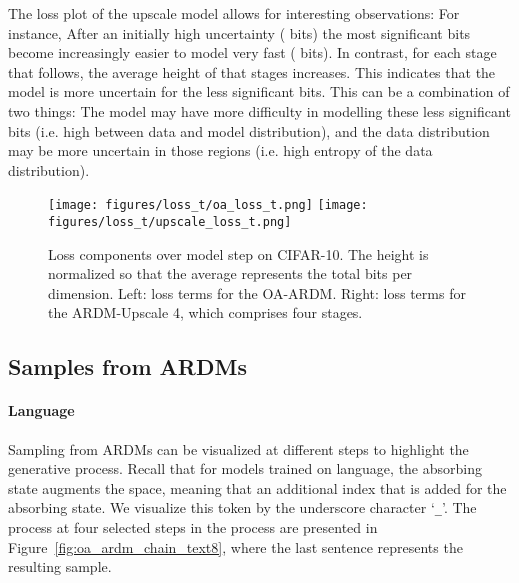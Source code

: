 \documentclass{article} \usepackage{iclr2022_conference,times}
\begin{document}
The loss plot of the upscale model allows for interesting observations: For instance, After an initially high uncertainty ( bits) the most significant bits become increasingly easier to model very fast ( bits). In contrast, for each stage that follows, the average height of that stages increases. This indicates that the model is more uncertain for the less significant bits. This can be a combination of two things: The model may have more difficulty in modelling these less significant bits (i.e. high  between data and model distribution), and the data distribution may be more uncertain in those regions (i.e. high entropy of the data distribution). 
\begin{figure}[H]
    \vspace{-.1cm}
    \centering
    \texttt{[image: figures/loss\_t/oa\_loss\_t.png]} \hfill 
    \texttt{[image: figures/loss\_t/upscale\_loss\_t.png]}
    \vspace{-.3cm}
    \caption{Loss components over model step on CIFAR-10. The height is normalized so that the average represents the total bits per dimension. Left: loss terms for the OA-ARDM. Right: loss terms for the ARDM-Upscale 4, which comprises four stages.}
    \label{fig:loss_t}
    \vspace{-.3cm}
\end{figure}


\subsection{Samples from ARDMs}
\paragraph{Language} Sampling from ARDMs can be visualized at different steps  to highlight the generative process. Recall that for models trained on language, the absorbing state augments the space, meaning that an additional index that is added for the absorbing state. We visualize this token by the underscore character `\texttt{\_}'. The process at four selected steps in the process are presented in Figure~\ref{fig:oa_ardm_chain_text8}, where the last sentence represents the resulting sample.


\end{document}
